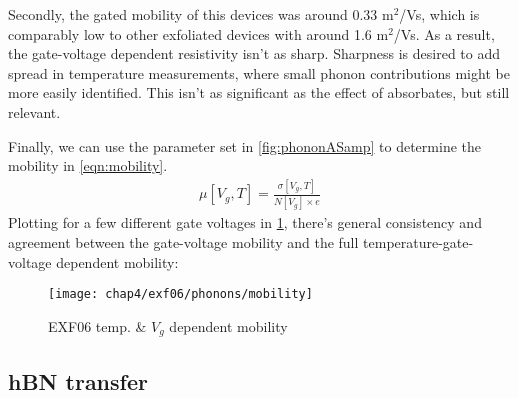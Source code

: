 \documentclass[../Matt_Gebert_Honours_Thesis.tex]{subfiles}
\begin{document}
Secondly, the gated mobility of this devices was around 0.33 m$^2$/Vs, which is comparably low to other exfoliated devices with around 1.6 m$^2$/Vs. As a result, the gate-voltage dependent resistivity isn't as sharp. Sharpness is desired to add spread in temperature measurements, where small phonon contributions might be more easily identified. This isn't as significant as the effect of absorbates, but still relevant.

Finally, we can use the parameter set in \cref{fig:phononASamp} to determine the mobility in \cref{eqn:mobility}.
\begin{align}
	\mu\left[V_g,T\right] = \frac{\sigma\left[V_g,T\right]}{N\left[V_g\right]\times e}\label{eqn:mobility}
\end{align}
Plotting for a few different gate voltages in \cref{fig:exf06_mobility}, there's general consistency and agreement between the gate-voltage mobility and the full temperature-gate-voltage dependent mobility:
\begin{figure}[H]
	\texttt{[image: chap4/exf06/phonons/mobility]}
	\caption[EXF06 temp. \& $V_g$ dependent mobility]{EXF06 temp. \& $V_g$ dependent mobility}\label{fig:exf06_mobility}
\end{figure}


\subsection{hBN transfer}
\end{document}
